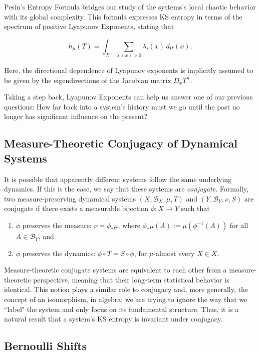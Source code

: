 \documentclass{article}
\begin{document}
Pesin's Entropy Formula bridges our study of the systems's local chaotic behavior with its global complexity. This formula expresses KS entropy in terms of the spectrum of positive Lyapunov Exponents, stating that

\[ h_{\mu}(T) = \int_X \sum_{\lambda_i(x) > 0} \lambda_i(x) \, d\mu(x). \]

Here, the directional dependence of Lyapunov exponents is implicitly assumed to be given by the eigendirections of the Jacobian matrix $D_xT^n$. 

Taking a step back, Lyapunov Exponents can help us answer one of our previous questions: How far back into a system's history must we go until the past no longer has significant influence on the present?

\subsection{Measure-Theoretic Conjugacy of Dynamical Systems}

It is possible that apparently different systems follow the same underlying dynamics. If this is the case, we say that these systems are \emph{conjugate}. Formally, two measure-preserving dynamical systems $(X,\mathcal{B}_X,\mu, T)$ and $(Y,\mathcal{B}_Y,\nu, S)$ are conjugate if there exists a measurable bijection $\phi:X\to Y$ such that
\begin{enumerate}
    \item $\phi$ preserves the measure: $\nu = \phi_*\mu$, where  $\phi_*\mu(A):=\mu(\phi^{-1}(A))$ for all $A\in\mathcal{B}_Y$, and
    \item $\phi$ preserves the dynamics: $\phi\circ T = S\circ\phi$, for $\mu$-almost every $X\in X$. 
\end{enumerate}

Measure-theoretic conjugate systems are equivalent to each other from a measure-theoretic perspective, meaning that their long-term statistical behavior is identical. This notion plays a similar role to conjugacy and, more generally, the concept of an isomorphism, in algebra; we are trying to ignore the way that we ``label" the system and only focus on its fundamental structure. Thus, it is a natural result that a system's KS entropy is invariant under conjugacy.

\subsection{Bernoulli Shifts}
\end{document}
